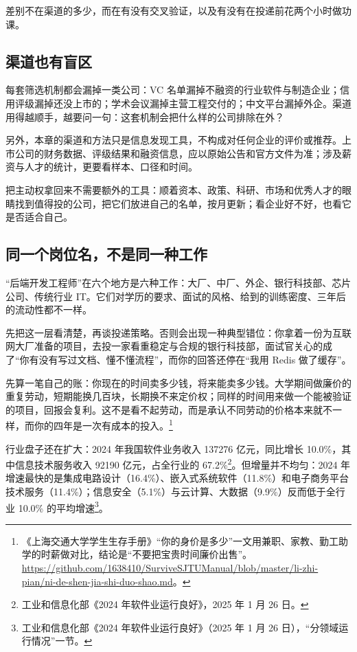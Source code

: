 \documentclass[UTF8,zihao=5,openany]{ctexbook}
\begin{document}
差别不在渠道的多少，而在有没有交叉验证，以及有没有在投递前花两个小时做功课。

\subsection{渠道也有盲区}
\begin{warningbox}
每套筛选机制都会漏掉一类公司：VC 名单漏掉不融资的行业软件与制造企业；信用评级漏掉还没上市的；学术会议漏掉主营工程交付的；中文平台漏掉外企。渠道用得越顺手，越要问一句：这套机制会把什么样的公司排除在外？
\end{warningbox}

另外，本章的渠道和方法只是信息发现工具，不构成对任何企业的评价或推荐。上市公司的财务数据、评级结果和融资信息，应以原始公告和官方文件为准；涉及薪资与人才的统计，更要看样本、口径和时间。

把主动权拿回来不需要额外的工具：顺着资本、政策、科研、市场和优秀人才的眼睛找到值得投的公司，把它们放进自己的名单，按月更新；看企业好不好，也看它是否适合自己。

\subsection{同一个岗位名，不是同一种工作}
“后端开发工程师”在六个地方是六种工作：大厂、中厂、外企、银行科技部、芯片公司、传统行业 IT。它们对学历的要求、面试的风格、给到的训练密度、三年后的流动性都不一样。

先把这一层看清楚，再谈投递策略。否则会出现一种典型错位：你拿着一份为互联网大厂准备的项目，去投一家看重稳定与合规的银行科技部，面试官关心的成了“你有没有写过文档、懂不懂流程”，而你的回答还停在“我用 Redis 做了缓存”。

先算一笔自己的账：你现在的时间卖多少钱，将来能卖多少钱。大学期间做廉价的重复劳动，短期能换几百块，长期换不来定价权；同样的时间用来做一个能被验证的项目，回报会复利。这不是看不起劳动，而是承认不同劳动的价格本来就不一样，而你的四年是一次有成本的投入。\footnote{《上海交通大学学生生存手册》“你的身价是多少”一文用兼职、家教、勤工助学的时薪做对比，结论是“不要把宝贵时间廉价出售”。\url{https://github.com/1638410/SurviveSJTUManual/blob/master/li-zhi-pian/ni-de-shen-jia-shi-duo-shao.md}。}

行业盘子还在扩大：2024 年我国软件业务收入 137276 亿元，同比增长 10.0\%，其中信息技术服务收入 92190 亿元，占全行业的 67.2\%\footnote{工业和信息化部《2024 年软件业运行良好》，2025 年 1 月 26 日。}。但增量并不均匀：2024 年增速最快的是集成电路设计（16.4\%）、嵌入式系统软件（11.8\%）和电子商务平台技术服务（11.4\%）；信息安全（5.1\%）与云计算、大数据（9.9\%）反而低于全行业 10.0\% 的平均增速\footnote{工业和信息化部《2024 年软件业运行良好》（2025 年 1 月 26 日），“分领域运行情况”一节。}。
\end{document}
